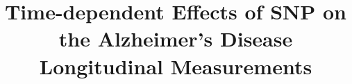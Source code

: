 \documentclass[11pt]{report}
\begin{document}
\title{Time-dependent Effects of SNP on the Alzheimer's Disease Longitudinal Measurements}





\firstpage




\figurespagetrue
\tablespagetrue

\singlespacing

\end{document}

